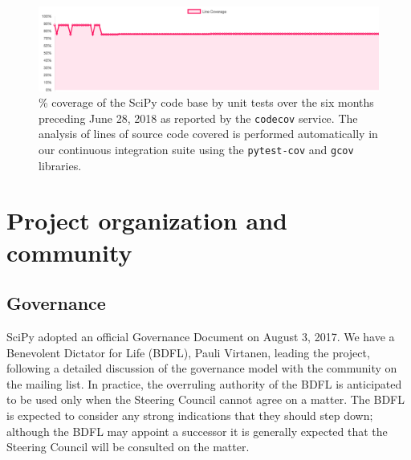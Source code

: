 \documentclass[fleqn,10pt]{wlscirep}
\begin{document}
\begin{figure}[H]
\centering
\includegraphics[width=\textwidth]{static/coverage-chart}
\caption{\% coverage of the SciPy code base by unit tests over the six months
preceding June 28, 2018 as reported by the \texttt{codecov} service. The
analysis of lines of source code covered is performed automatically in our
continuous integration suite using the \texttt{pytest-cov} and \texttt{gcov}
libraries.}
\label{fig:coverage}
\end{figure}


\section*{Project organization and community}

\subsection*{Governance}

SciPy adopted an official Governance Document on August 3,
2017\cite{SciPyProjectGovernance}.  We have a Benevolent Dictator for Life
(BDFL), Pauli Virtanen, leading the project, following a detailed discussion of
the governance model with the community on the mailing list.  In practice, the
overruling authority of the BDFL is anticipated to be used only when the
Steering Council cannot agree on a matter.  The BDFL is expected to consider
any strong indications that they should step down; although the BDFL may
appoint a successor it is generally expected that the Steering Council will be
consulted on the matter.
\end{document}
